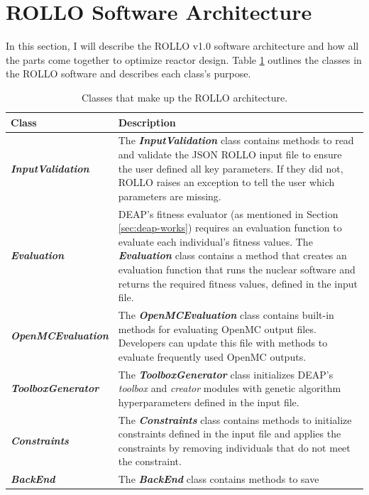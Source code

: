 \section{\gls{ROLLO} Software Architecture}
In this section, I will describe the \gls{ROLLO} v1.0 software architecture and 
how all the parts come together to optimize reactor design. 
Table \ref{tab:rollo-architecture} outlines the classes in the \gls{ROLLO} software 
and describes each class's purpose.
\begin{table}[]
    \centering
    \onehalfspacing
    \caption{Classes that make up the \gls{ROLLO} architecture. }
	\label{tab:rollo-architecture}
    \footnotesize
    \begin{tabular}{l|p{}}
    \hline
    \textbf{Class} & \textbf{Description} \\ \hline
    \textbf{\textit{InputValidation}} & The \textbf{\textit{InputValidation}} class contains methods 
    to read and validate the JSON \gls{ROLLO} input file to 
    ensure the user defined all key parameters. If they did not, \gls{ROLLO} 
    raises an exception to tell the user which parameters are missing. \\
    \hline
    \textbf{\textit{Evaluation}} & \gls{DEAP}'s fitness evaluator (as mentioned in Section 
    \ref{sec:deap-works}) requires an evaluation function to evaluate each 
    individual's fitness values. 
    The \textbf{\textit{Evaluation}} class contains a method that creates an evaluation 
    function that runs the nuclear software and returns the required fitness values, 
    defined in the input file. \\
    \hline 
    \textbf{\textit{OpenMCEvaluation}} & The \textbf{\textit{OpenMCEvaluation}} class contains
    built-in methods for evaluating OpenMC output files. Developers can update 
    this file with methods to evaluate frequently used OpenMC outputs. \\
    \hline 
    \textbf{\textit{ToolboxGenerator}} & The \textbf{\textit{ToolboxGenerator}} class initializes
    \gls{DEAP}'s \textit{toolbox} and \textit{creator} modules with genetic algorithm 
    hyperparameters defined in the input file.\\
    \hline
    \textbf{\textit{Constraints}} & The \textbf{\textit{Constraints}} class 
    contains methods to initialize constraints defined in the input file 
    and applies the constraints by removing individuals that do not meet the 
    constraint.\\
    \hline 
    \textbf{\textit{BackEnd}} & The \textbf{\textit{BackEnd}} class contains methods to save 

\end{tabular}
\end{table}
